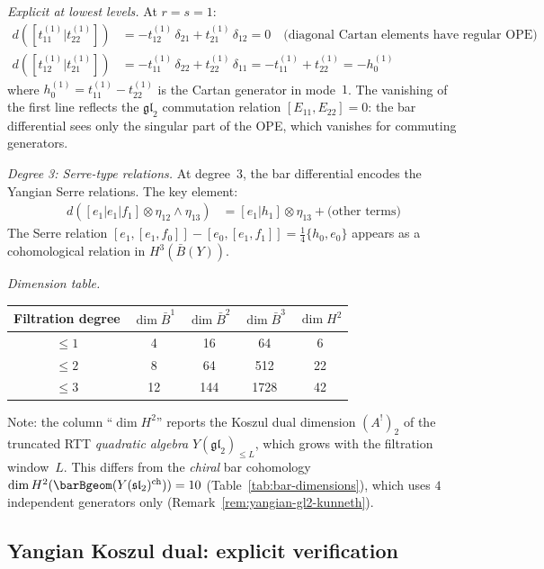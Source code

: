 \begin{computation}
\emph{Explicit at lowest levels.}
At $r = s = 1$:
\begin{align*}
d([t_{11}^{(1)} | t_{22}^{(1)}])
&= -t_{12}^{(1)}\,\delta_{21} + t_{21}^{(1)}\,\delta_{12} = 0
\quad\text{(diagonal Cartan elements have regular OPE)} \\
d([t_{12}^{(1)} | t_{21}^{(1)}])
&= -t_{11}^{(1)}\,\delta_{22} + t_{22}^{(1)}\,\delta_{11}
= -t_{11}^{(1)} + t_{22}^{(1)} = -h_0^{(1)}
\end{align*}
where $h_0^{(1)} = t_{11}^{(1)} - t_{22}^{(1)}$ is the Cartan
generator in mode~$1$. The vanishing of the first line reflects
the $\mathfrak{gl}_2$ commutation relation
$[E_{11}, E_{22}] = 0$: the bar differential sees only the
singular part of the OPE, which vanishes for commuting generators.

\emph{Degree 3: Serre-type relations.}
At degree~3, the bar differential encodes the Yangian Serre
relations. The key element:
\begin{align*}
d([e_1 | e_1 | f_1] \otimes \eta_{12} \wedge \eta_{13})
&= [e_1 | h_1] \otimes \eta_{13}
+ \text{(other terms)}
\end{align*}
The Serre relation
$[e_1, [e_1, f_0]] - [e_0, [e_1, f_1]] = \frac{1}{4}\{h_0, e_0\}$
appears as a cohomological relation in $H^3(\bar{B}(Y))$.

\emph{Dimension table.}
\begin{center}
\renewcommand{\arraystretch}{1.2}
\begin{tabular}{c|cccc}
Filtration degree & $\dim \bar{B}^1$ & $\dim \bar{B}^2$ &
$\dim \bar{B}^3$ & $\dim H^2$ \\
\hline
$\leq 1$ & 4 & 16 & 64 & 6 \\
$\leq 2$ & 8 & 64 & 512 & 22 \\
$\leq 3$ & 12 & 144 & 1728 & 42
\end{tabular}
\end{center}
Note: the column ``$\dim H^2$'' reports the Koszul dual dimension
$(A^!)_2$ of the truncated RTT \emph{quadratic algebra}
$Y(\mathfrak{gl}_2)_{\leq L}$, which grows with the filtration
window~$L$. This differs from the \emph{chiral} bar cohomology
$\dim H^2(\barBgeom(Y(\mathfrak{sl}_2)^{\mathrm{ch}})) = 10$
(Table~\ref{tab:bar-dimensions}), which uses
$4$ independent generators only (Remark~\ref{rem:yangian-gl2-kunneth}).
\end{computation}


\subsection{Yangian Koszul dual: explicit verification}

